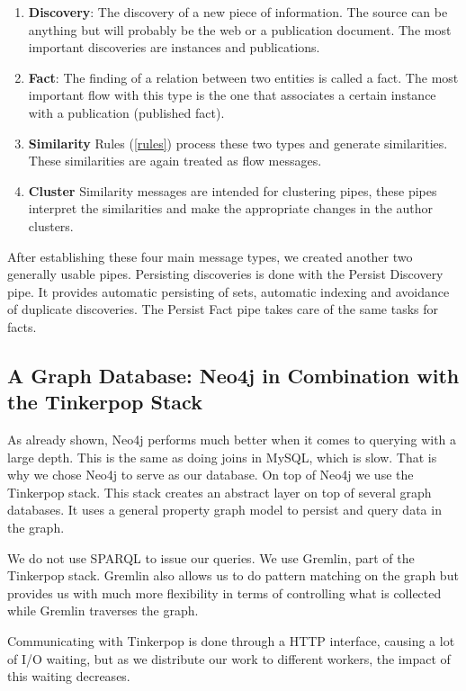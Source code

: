 \begin{enumerate}
\item \textbf{Discovery}: The discovery of a new piece of information. The source can be anything but will probably be the web or a publication document. The most important discoveries are instances and publications.
\item \textbf{Fact}: The finding of a relation between two entities is called a fact. The most important flow with this type is the one that associates a certain instance with a publication (published fact).
\item \textbf{Similarity} Rules (\autoref{rules}) process these two types and generate similarities. These similarities are again treated as flow messages.
\item \textbf{Cluster} Similarity messages are intended for clustering pipes, these pipes interpret the similarities and make the appropriate changes in the author clusters.
\end{enumerate}

After establishing these four main message types, we created another two generally usable pipes. Persisting discoveries is done with the Persist Discovery pipe. It provides automatic persisting of sets, automatic indexing and avoidance of duplicate discoveries. The Persist Fact pipe takes care of the same tasks for facts.

\subsection{A Graph Database: Neo4j in Combination with the Tinkerpop Stack}

As already shown, Neo4j performs much better when it comes to querying with a large depth. This is the same as doing joins in MySQL, which is slow. That is why we chose Neo4j to serve as our database. On top of Neo4j we use the Tinkerpop stack. This stack creates an abstract layer on top of several graph databases. It uses a general property graph model to persist and query data in the graph.

We do not use SPARQL to issue our queries. We use Gremlin, part of the Tinkerpop stack. Gremlin also allows us to do pattern matching on the graph but provides us with much more flexibility in terms of controlling what is collected while Gremlin traverses the graph.

Communicating with Tinkerpop is done through a HTTP interface, causing a lot of I/O waiting, but as we distribute our work to different workers, the impact of this waiting decreases.

